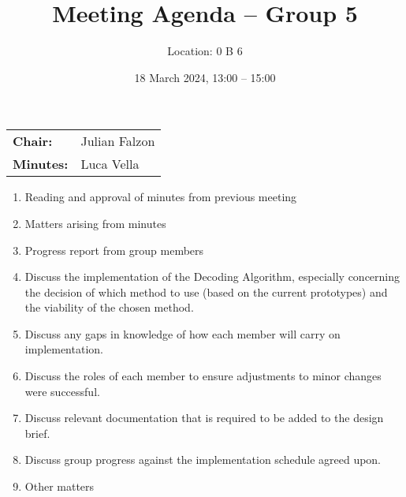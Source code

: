 \documentclass{cce2014-meetings}
\title{Meeting Agenda -- Group 5}
\author{Location: 0 B 6}
\date{18 March 2024, 13:00 -- 15:00}
\begin{document}
\maketitle
\begin{center}
\begin{tabular}{ll}
\textbf{Chair:}   & Julian Falzon \\
\textbf{Minutes:} & Luca Vella
\end{tabular}
\end{center}

\begin{enumerate}

\item Reading and approval of minutes from previous meeting

\item Matters arising from minutes

\item Progress report from group members

\item Discuss the implementation of the Decoding Algorithm, especially concerning the decision of which method to use (based on the current prototypes) and the viability of the chosen method.

\item Discuss any gaps in knowledge of how each member will carry on implementation.

\item Discuss the roles of each member to ensure adjustments to minor changes were successful.

\item Discuss relevant documentation that is required to be added to the design brief.

\item Discuss group progress against the implementation schedule agreed upon.


\item Other matters

\end{enumerate}
\end{document}
